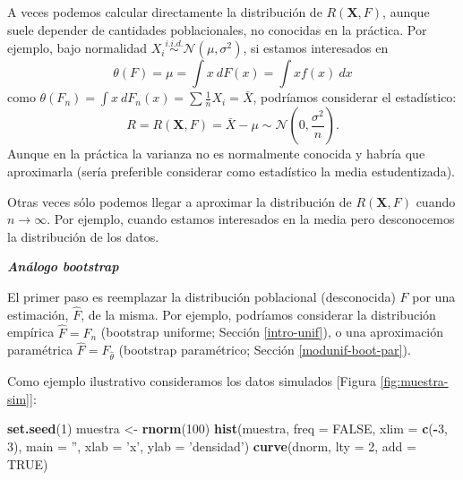 \documentclass[]{book}
\newenvironment{Shaded}{\begin{snugshade}}{\end{snugshade}}
\newcommand{\KeywordTok}[1]{\textcolor[rgb]{0.13,0.29,0.53}{\textbf{#1}}}
\newcommand{\DataTypeTok}[1]{\textcolor[rgb]{0.13,0.29,0.53}{#1}}
\newcommand{\DecValTok}[1]{\textcolor[rgb]{0.00,0.00,0.81}{#1}}
\newcommand{\StringTok}[1]{\textcolor[rgb]{0.31,0.60,0.02}{#1}}
\newcommand{\OtherTok}[1]{\textcolor[rgb]{0.56,0.35,0.01}{#1}}
\newcommand{\OperatorTok}[1]{\textcolor[rgb]{0.81,0.36,0.00}{\textbf{#1}}}
\newcommand{\NormalTok}[1]{#1}
\theoremstyle{break}
\theoremstyle{definition}
\theoremstyle{definition}
\theoremstyle{definition}
\theoremstyle{remark}
\begin{document}
A veces podemos calcular directamente la distribución de
\(R\left( \mathbf{X},F \right)\), aunque suele depender de cantidades
poblacionales, no conocidas en la práctica. Por ejemplo, bajo normalidad
\(X_i \overset{i.i.d.}{\sim} \mathcal{N}\left( \mu ,\sigma^2 \right)\),
si estamos interesados en
\[\theta \left( F \right) =\mu =\int x~dF\left( x \right) =\int xf\left( x \right) ~dx\]
como
\(\theta \left( F_n \right) = \int x~dF_n\left( x \right) = \sum \frac{1}{n}X_i = \bar{X}\),
podríamos considerar el estadístico:
\[R=R\left( \mathbf{X},F \right) = \bar{X} - \mu \sim \mathcal{N}\left( 0 ,\frac{\sigma^2}{n} \right).\]
Aunque en la práctica la varianza no es normalmente conocida y habría
que aproximarla (sería preferible considerar como estadístico la media
estudentizada).

Otras veces sólo podemos llegar a aproximar la distribución de
\(R\left( \mathbf{X},F \right)\) cuando \(n \rightarrow \infty\). Por
ejemplo, cuando estamos interesados en la media pero desconocemos la
distribución de los datos.

\textbf{\emph{Análogo bootstrap}}

El primer paso es reemplazar la distribución poblacional (desconocida)
\(F\) por una estimación, \(\hat{F}\), de la misma. Por ejemplo,
podríamos considerar la distribución empírica \(\hat{F}=F_n\) (bootstrap
uniforme; Sección \ref{intro-unif}), o una aproximación paramétrica
\(\hat{F}=F_{\hat \theta}\) (bootstrap paramétrico; Sección
\ref{modunif-boot-par}).

Como ejemplo ilustrativo consideramos los datos simulados {[}Figura
\ref{fig:muestra-sim}{]}:

\begin{Shaded}
\begin{Highlighting}[]
\KeywordTok{set.seed}\NormalTok{(}\DecValTok{1}\NormalTok{)}
\NormalTok{muestra <-}\StringTok{ }\KeywordTok{rnorm}\NormalTok{(}\DecValTok{100}\NormalTok{)}
\KeywordTok{hist}\NormalTok{(muestra, }\DataTypeTok{freq =} \OtherTok{FALSE}\NormalTok{, }\DataTypeTok{xlim =} \KeywordTok{c}\NormalTok{(}\OperatorTok{-}\DecValTok{3}\NormalTok{, }\DecValTok{3}\NormalTok{),}
     \DataTypeTok{main =} \StringTok{''}\NormalTok{, }\DataTypeTok{xlab =} \StringTok{'x'}\NormalTok{, }\DataTypeTok{ylab =} \StringTok{'densidad'}\NormalTok{)}
\KeywordTok{curve}\NormalTok{(dnorm, }\DataTypeTok{lty =} \DecValTok{2}\NormalTok{, }\DataTypeTok{add =} \OtherTok{TRUE}\NormalTok{)}
\end{Highlighting}
\end{Shaded}
\end{document}
